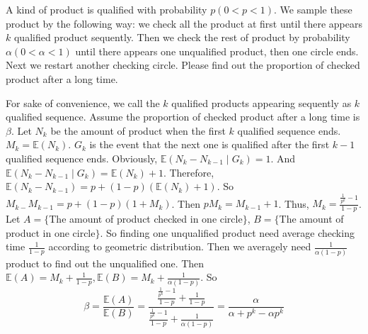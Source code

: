\documentclass{ctexart}
\newif\ifpreface
\begin{document}
\large
\setlength{\baselineskip}{1.2em}
\ifpreface
  
\else
\fi
{}
\begin{problem}\label{pro:4 }
  A kind of product is qualified with probability \(p(0 < p < 1)\).
  We sample these product by the following way: we check all the product at first until there appears
  \(k\) qualified product sequently. Then we check the rest of product by probability \(\alpha(0 < \alpha <1)\)
  until there appears one unqualified product, then one circle ends. Next we restart another checking
  circle. Please find out the proportion of checked product after a long time.
\end{problem}
\begin{solution}
  For sake of convenience, we call the \(k\) qualified products appearing sequently as \(k\) qualified sequence.
  Assume the proportion of checked product after a long time is \(\beta\).
  Let \(N_k\) be the amount of product when the first \(k\) qualified sequence ends. \(M_k=\mathbb{E}(N_k)\). \(G_k\) is the
  event that the next one is qualified after the first \(k-1\) qualified sequence ends. Obviously, \(\mathbb{E}(N_k-N_{k-1} \mid G_k)=1\).
  And \(\mathbb{E}(N_k-N_{k-1} \mid G_k)=\mathbb{E}(N_k) + 1\).
  Therefore, \(\mathbb{E}(N_k-N_{k-1})=p + (1-p)(\mathbb{E}(N_k) + 1)\). So \(M_{k-} M_{k-1}=p + (1-p)( 1 + M_k)\).
  Then \(pM_k=M_{k-1} + 1\). Thus, \(M_k=\frac{\frac{1}{p^k}-1}{1-p}\).
  Let \(A=\{\)The amount of product checked in one circle\(\}\), \(B=\{\)The amount of product in one circle\(\}\).
  So finding one unqualified product need average checking time \(\frac{1}{1-p}\) according to geometric distribution.
  Then we averagely need \(\frac{1}{\alpha(1-p)}\) product to find out the unqualified one.
  Then \(\mathbb{E}(A)=M_k + \frac{1}{1-p}, \mathbb{E}(B)=M_k + \frac{1}{\alpha(1-p)}\).
  So \[
    \beta = \frac{\mathbb{E}(A)}{\mathbb{E}(B)}=\frac{\frac{\frac{1}{p^k}-1}{1-p} + \frac{1}{1-p}}{\frac{\frac{1}{p^k}-1}{1-p} + \frac{1}{\alpha(1-p)}}=\frac{\alpha}{\alpha + p^k-\alpha p^k}
  \]

\end{solution}
\end{document}
